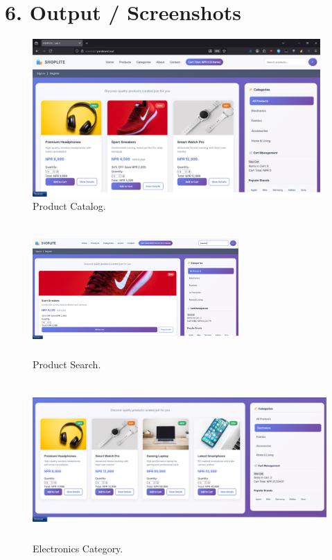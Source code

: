 \documentclass[a4paper,12pt]{article}
\begin{document}
\section*{6. Output / Screenshots}

\begin{figure}[H]
  \centering
  \includegraphics[width=\textwidth,height=6cm,keepaspectratio]{images/output1.png}
  \caption{Product Catalog.}
  \label{fig:img1}
\end{figure}

\begin{figure}[H]
  \centering
  \includegraphics[width=0.7\textwidth,height=5cm,keepaspectratio]{images/output2.png}
  \caption{Product Search.}
  \label{fig:img2}
\end{figure}

\begin{figure}[H]
  \centering
  \includegraphics[width=\textwidth,height=6cm,keepaspectratio]{images/output3.png}
  \caption{Electronics Category.}
  \label{fig:img3}
\end{figure}
\end{document}

